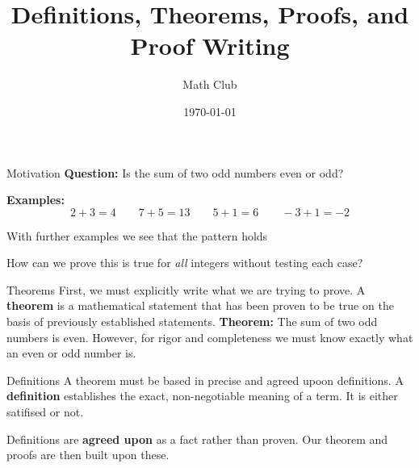 \documentclass{beamer}
\title{Definitions, Theorems, Proofs, and Proof Writing}
\author{Math Club}
\date{\today}
\begin{document}
\frame{\titlepage}

\begin{frame}{Motivation}
  \textbf{Question:} Is the sum of two odd numbers even or odd?

  \vspace{0.5em}
  \textbf{Examples:}
  \[
    2 + 3 = 4 \qquad 7 + 5 = 13 \qquad 5 + 1 = 6 \qquad -3 + 1 = -2
  \]
  
  \vspace{0.5em}
  With further examples we see that the pattern holds
  
  \vspace{1em}
  How can we prove this is true for \emph{all} integers without testing each case?
\end{frame}

\begin{frame}{Theorems}
    First, we must explicitly write what we are trying to prove.
    A \textbf{theorem} is a mathematical statement that has been proven to be true on the basis of previously established statements.
    \vspace{0.5em}
    \textbf{Theorem:} The sum of two odd numbers is even.
    \vspace{0.5em}
    However, for rigor and completeness we must know exactly what an even or odd number is. 
\end{frame}

\begin{frame}{Definitions}
  A theorem must be based in precise and agreed upoon definitions.
  A \textbf{definition} establishes the exact, non-negotiable meaning of a term. It is either satifised or not.

  \vspace{1em}
    Definitions are \textbf{agreed upon} as a fact rather than proven. Our theorem and proofs are then built upon these.
\end{frame}
\end{document}
